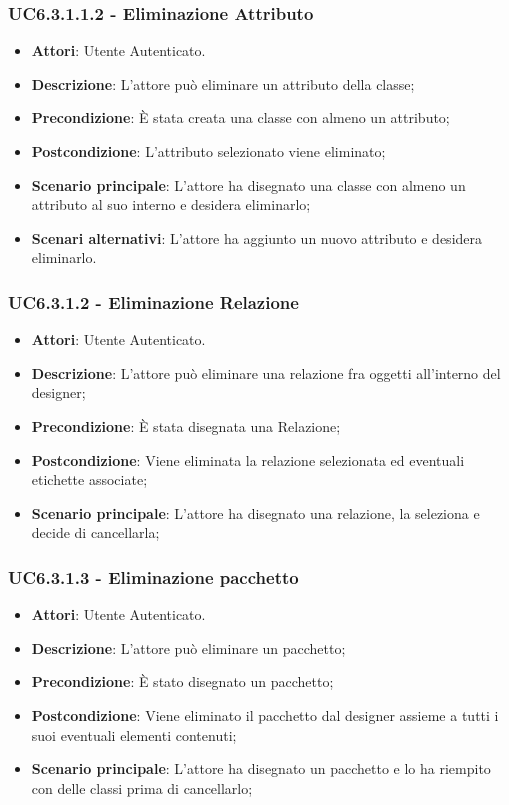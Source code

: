\subsubsection{UC6.3.1.1.2 - Eliminazione Attributo} 
\label{sssec:UC6.3.1.1.2} 
\begin{itemize} 
\item \textbf{Attori}: Utente Autenticato.
\item \textbf{Descrizione}: L'attore può eliminare un attributo della classe;
\item \textbf{Precondizione}: È stata creata una classe con almeno un attributo;
\item \textbf{Postcondizione}: L'attributo selezionato viene eliminato;
\item \textbf{Scenario principale}: L'attore ha disegnato una classe con almeno un attributo al suo interno e desidera eliminarlo;\item \textbf{Scenari alternativi}: L'attore ha aggiunto un nuovo attributo e desidera eliminarlo.
\end{itemize} 
\subsubsection{UC6.3.1.2 - Eliminazione Relazione} 
\label{sssec:UC6.3.1.2} 
\begin{itemize} 
\item \textbf{Attori}: Utente Autenticato.
\item \textbf{Descrizione}: L'attore può eliminare una relazione fra oggetti all'interno del designer;
\item \textbf{Precondizione}: È stata disegnata una Relazione;
\item \textbf{Postcondizione}: Viene eliminata la relazione selezionata ed eventuali etichette associate;
\item \textbf{Scenario principale}: L'attore ha disegnato una relazione, la seleziona e decide di cancellarla;\end{itemize} 
\subsubsection{UC6.3.1.3 - Eliminazione pacchetto} 
\label{sssec:UC6.3.1.3} 
\begin{itemize} 
\item \textbf{Attori}: Utente Autenticato.
\item \textbf{Descrizione}: L'attore può eliminare un pacchetto;
\item \textbf{Precondizione}: È stato disegnato un pacchetto;
\item \textbf{Postcondizione}: Viene eliminato il pacchetto dal designer assieme a tutti i suoi eventuali elementi contenuti;
\item \textbf{Scenario principale}: L'attore ha disegnato un pacchetto e lo ha riempito con delle classi prima di cancellarlo;\end{itemize} 
